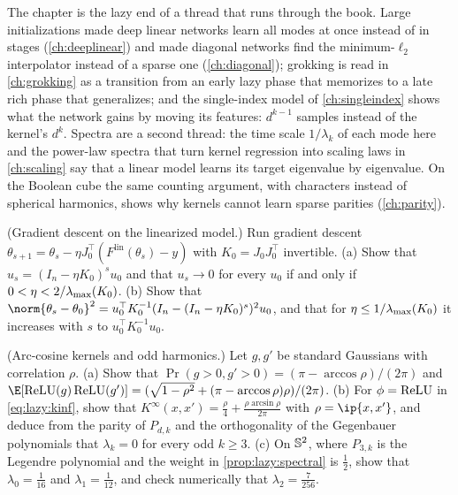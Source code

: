 \begin{refsection}
The chapter is the lazy end of a thread that runs through the book. Large initializations made deep linear networks learn all modes at once instead of in stages (\cref{ch:deeplinear}) and made diagonal networks find the minimum-$\ell_2$ interpolator instead of a sparse one (\cref{ch:diagonal}); grokking is read in \cref{ch:grokking} as a transition from an early lazy phase that memorizes to a late rich phase that generalizes; and the single-index model of \cref{ch:singleindex} shows what the network gains by moving its features: $d^{k-1}$ samples instead of the kernel's $d^k$. Spectra are a second thread: the time scale $1/\lambda_k$ of each mode here and the power-law spectra that turn kernel regression into scaling laws in \cref{ch:scaling} say that a linear model learns its target eigenvalue by eigenvalue. On the Boolean cube the same counting argument, with characters instead of spherical harmonics, shows why kernels cannot learn sparse parities (\cref{ch:parity}).

\begin{exercises}
\item \consolidation (Gradient descent on the linearized model.) Run gradient descent $\theta_{s+1}=\theta_s-\eta J_0^\top(F^{\mathrm{lin}}(\theta_s)-y)$ with $K_0=J_0J_0^\top$ invertible. (a) Show that $u_s=(I_n-\eta K_0)^su_0$ and that $u_s\to0$ for every $u_0$ if and only if $0<\eta<2/\lambda_{\max}(K_0)$. (b) Show that $\norm{\theta_s-\theta_0}^2=u_0^\top K_0^{-1}(I_n-(I_n-\eta K_0)^s)^2u_0$, and that for $\eta\le1/\lambda_{\max}(K_0)$ it increases with $s$ to $u_0^\top K_0^{-1}u_0$.\label{ex:lazy:gd}

\item \consolidation (Arc-cosine kernels and odd harmonics.) Let $g,g'$ be standard Gaussians with correlation $\rho$. (a) Show that $\Pr(g>0,g'>0)=(\pi-\arccos\rho)/(2\pi)$ and $\E[\relu(g)\relu(g')]=(\sqrt{1-\rho^2}+(\pi-\arccos\rho)\rho)/(2\pi)$. (b) For $\phi=\operatorname{ReLU}$ in \eqref{eq:lazy:kinf}, show that $K^\infty(x,x')=\frac\rho4+\frac{\rho\arcsin\rho}{2\pi}$ with $\rho=\ip{x,x'}$, and deduce from the parity of $P_{d,k}$ and the orthogonality of the Gegenbauer polynomials that $\lambda_k=0$ for every odd $k\ge3$. (c) On $\mathbb{S}^2$, where $P_{3,k}$ is the Legendre polynomial and the weight in \cref{prop:lazy:spectral} is $\frac12$, show that $\lambda_0=\frac1{16}$ and $\lambda_1=\frac1{12}$, and check numerically that $\lambda_2=\frac7{256}$. \label{ex:lazy:relu}


\end{exercises}
\end{refsection}
